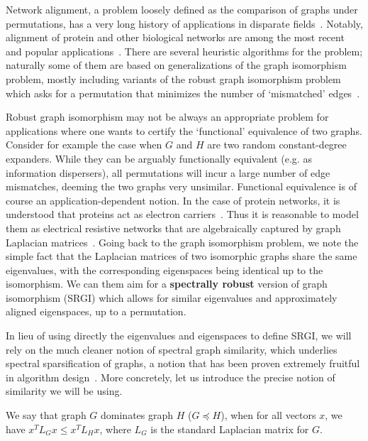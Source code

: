 Network alignment, a problem loosely defined as the comparison of graphs under permutations, has a very long history of applications in disparate fields~\cite{Emmert-Streib:2016}. Notably, alignment of protein and other biological networks are among the most recent and popular applications~\cite{Patrok12,FeiziQMMKJ16}. There are several heuristic algorithms for the problem; naturally some of them are based on generalizations of the graph isomorphism problem, mostly including variants of the robust graph isomorphism problem which asks for a permutation that minimizes the number of `mismatched' edges~\cite{odonnell}.

Robust graph isomorphism may not be always an appropriate problem for applications where one wants to certify the `functional' equivalence of two graphs. Consider for example the case when $G$ and $H$ are two random constant-degree expanders. While they can be arguably functionally equivalent (e.g. as information dispersers), all permutations will incur a large number of edge mismatches, deeming the two graphs very unsimilar.
Functional equivalence is of course an application-dependent notion. In the case of protein networks, it is understood that proteins act as electron carriers~\cite{hanukoglu1996}. Thus it is reasonable to model them as electrical resistive networks that are algebraically captured by graph Laplacian matrices~\cite{doylesnell00}. Going back to the graph isomorphism problem, we note the simple fact that the Laplacian matrices of two isomorphic graphs share the same eigenvalues, with the corresponding eigenspaces being identical up to the isomorphism. We can them aim for a \textbf{spectrally robust} version of graph isomorphism (SRGI) which allows for similar eigenvalues and approximately aligned eigenspaces, up to a permutation. 

In lieu of using directly the eigenvalues and eigenspaces to define SRGI, we will rely on the much cleaner notion of spectral graph similarity, which underlies spectral sparsification of graphs, a notion that has been proven extremely fruitful in algorithm design~\cite{Batson2013, Koutis:2012}. 
More concretely, let us introduce the precise notion of similarity
we will be using. 

\begin{definition} [dominance] \label{def:dominance}
	We say that graph $G$ dominates graph $H$ ($G\preceq H$), when 
	for all vectors $x$, we have $x^T L_G x \leq x^T L_H x$, where $L_G$ is the standard Laplacian matrix for $G$.  
\end{definition}	

